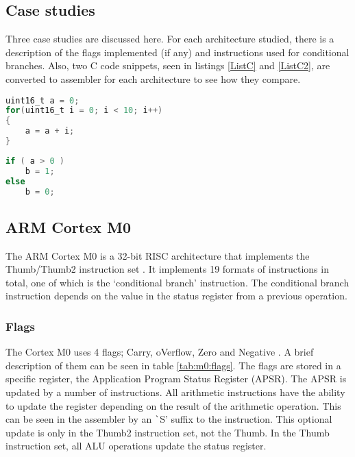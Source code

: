\documentclass[12pt,a4paper]{article}
\begin{document}
\begin{bibunit}[is-unsrt]
\section{Case studies}

Three case studies are discussed here. 
For each architecture studied, there is a description of the flags implemented (if any) and instructions used for conditional branches. 
Also, two C code snippets, seen in listings \ref{ListC} and \ref{ListC2}, are converted to assembler for each architecture to see how they compare.
\begin{lstlisting}[frame=single,caption=C Code,language=C,label=ListC]
uint16_t a = 0;
for(uint16_t i = 0; i < 10; i++)
{
	a = a + i;
}
\end{lstlisting}
\begin{lstlisting}[frame=single,caption=C Code,language=C,label=ListC2]
if ( a > 0 )
	b = 1;
else
	b = 0;
\end{lstlisting}
\subsection{ARM Cortex M0}

The ARM Cortex M0 is a 32-bit RISC architecture that implements the Thumb/Thumb2 instruction set \cite{ARM:CortexM0}. 
It implements 19 formats of instructions in total, one of which is the `conditional branch' instruction. 
The conditional branch instruction depends on the value in the status register from a previous operation.

\subsubsection{Flags}
The Cortex M0 uses 4 flags; Carry, oVerflow, Zero and Negative \cite{ARM:Flags}.
A brief description of them can be seen in table \ref{tab:m0:flags}.
The flags are stored in a specific register, the Application Program Status Register (APSR). 
The APSR is updated by a number of instructions. 
All arithmetic instructions have the ability to update the register depending on the result of the arithmetic operation. 
This can be seen in the assembler by an {\texttt `S'} suffix to the instruction.
This optional update is only in the Thumb2 instruction set, not the Thumb.
In the Thumb instruction set, all ALU operations update the status register.


\end{bibunit}
\end{document}
